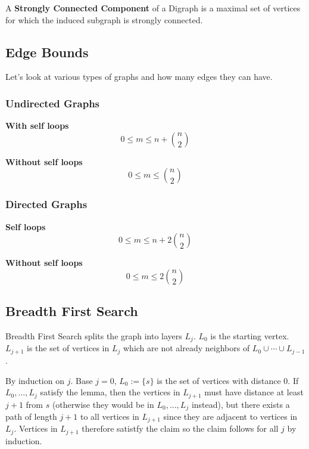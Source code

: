 \documentclass[12pt]{article}
\begin{document}
   {
    A {\bf Strongly Connected Component} of a Digraph is a maximal set of vertices
    for which the induced subgraph is strongly connected.
  }


  \subsection{Edge Bounds}

  Let's look at various types of graphs and how many edges they can have.

  \begin{multicols}{2}
    \subsubsection{Undirected Graphs}

    {\bf With self loops}
    \[
      0 \le m \le n + \binom{n}{2}
    \]

    {\bf Without self loops}
    \[
      0 \le m \le \binom{n}{2}
    \]

    \subsubsection{Directed Graphs}

    {\bf Self loops}
    \[
      0 \le m \le n + 2\binom{n}{2}
    \]

    {\bf Without self loops}
    \[
      0 \le m \le 2\binom{n}{2}
    \]
  \end{multicols}




  \subsection{Breadth First Search}

  Breadth First Search splits the graph into layers $L_j$. $L_0$ is the starting
  vertex. $L_{j + 1}$ is the set of vertices in $L_j$ which are not already
  neighbors of $L_0 \cup \cdots \cup L_{j - 1}$.

  {
    By induction on $j$. Base $j = 0$, $L_0 := \{s\}$ is the set of vertices
    with distance $0$. If $L_0, ..., L_j$ satisfy the lemma, then the vertices
    in $L_{j + 1}$ must have distance at least $j + 1$ from $s$ (otherwise they
    would be in $L_0, ..., L_j$ instead), but there exists a path of length $j +
    1$ to all vertices in $L_{j + 1}$ since they are adjacent to vertices in
    $L_j$. Vertices in $L_{j + 1}$ therefore satistfy the claim so the claim
    follows for all $j$ by induction.
  }
\end{document}
